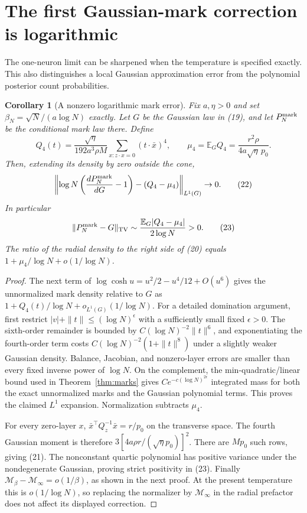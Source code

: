 \documentclass[11pt]{article}
\newtheorem{corollary}[theorem]{Corollary}
\newcommand{\E}{\mathbb E}\newcommand{\R}{\mathbb R}
\begin{document}
\section{The first Gaussian-mark correction is logarithmic}
The one-neuron limit can be sharpened when the temperature is specified
exactly. This also distinguishes a local Gaussian approximation error
from the polynomial posterior count probabilities.

\begin{corollary}[A nonzero logarithmic mark error]\label{cor:mark-rate}
Fix $a,\eta>0$ and set $\beta_N=\sqrt N/(a\log N)$ exactly. Let $G$
be the Gaussian law in (19), and let $P_N^{\rm mark}$ be the conditional
mark law there. Define
\[
 Q_4(t)=\frac{\sqrt\eta}{192a^3\rho M}
                         \sum_{x:z\cdot x=0}(t\cdot\bar x)^4,
 \qquad \mu_4=\E_G Q_4=\frac{r^2\rho}{4a\sqrt\eta\,p_0}.
                                                               \tag{21}
\]
Then, extending its density by zero outside the cone,
\[
 \left\|\log N\left(\frac{dP_N^{\rm mark}}{dG}-1\right)
                           -(Q_4-\mu_4)\right\|_{L^1(G)}\to0.
                                                               \tag{22}
\]
In particular
\[
 \|P_N^{\rm mark}-G\|_{\rm TV}
       \sim\frac{\E_G|Q_4-\mu_4|}{2\log N}>0.
                                                               \tag{23}
\]
The ratio of the radial density to the right side of (20) equals
$1+\mu_4/\log N+o(1/\log N)$.
\end{corollary}
\begin{proof}
The next term of $\log\cosh u=u^2/2-u^4/12+O(u^6)$ gives the
unnormalized mark density relative to $G$ as
$1+Q_4(t)/\log N+o_{L^1(G)}(1/\log N)$.
For a detailed domination argument, first restrict
$|v|+\|t\|\le(\log N)^\epsilon$ with a sufficiently small fixed
$\epsilon>0$. The sixth-order remainder is bounded by
$C(\log N)^{-2}\|t\|^6$, and exponentiating the fourth-order term
costs $C(\log N)^{-2}(1+\|t\|^8)$ under a slightly weaker Gaussian
density. Balance, Jacobian, and nonzero-layer errors are smaller than
every fixed inverse power of $\log N$. On the complement, the
min-quadratic/linear bound used in Theorem~\ref{thm:marks} gives
$Ce^{-c(\log N)^{2\epsilon}}$ integrated mass for both the exact
unnormalized marks and the Gaussian polynomial terms. This proves
the claimed $L^1$ expansion. Normalization subtracts $\mu_4$.

For every zero-layer $x$,
$\bar x^\top Q_z^{-1}\bar x=r/p_0$ on the transverse space.
The fourth Gaussian moment is therefore
$3[4a\rho r/(\sqrt\eta p_0)]^2$. There are $Mp_0$ such rows, giving
(21). The nonconstant quartic polynomial has positive variance under
the nondegenerate Gaussian, proving strict positivity in (23).
Finally $\mathcal M_\beta-\mathcal M_\infty=o(1/\beta)$, as shown
in the next proof. At the present temperature this is
$o(1/\log N)$, so replacing the normalizer by $\mathcal M_\infty$
in the radial prefactor does not affect its displayed correction.
\end{proof}
\end{document}
